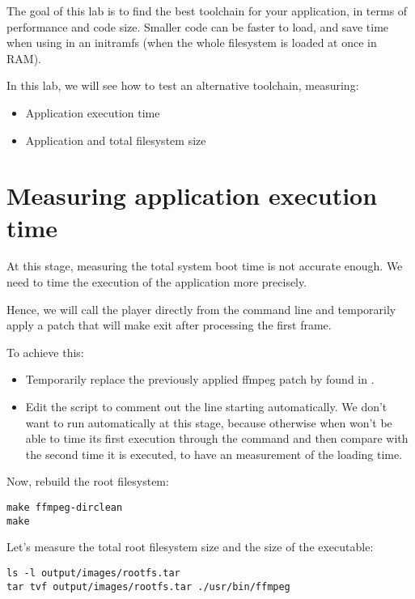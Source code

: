 
The goal of this lab is to find the best toolchain for your application,
in terms of performance and code size. Smaller code can be faster to
load, and save time when using in an initramfs (when the whole
filesystem is loaded at once in RAM).

In this lab, we will see how to test an alternative toolchain, measuring:
\begin{itemize}
 \item Application execution time
 \item Application and total filesystem size
\end{itemize}

\section{Measuring application execution time}

At this stage, measuring the total system boot time is not accurate
enough. We need to time the execution of the application more precisely.

Hence, we will call the  player directly from the command
line and temporarily apply a patch that will make 
exit after processing the first frame.

To achieve this:
\begin{itemize}
\item Temporarily replace the previously applied ffmpeg patch
by  found in
.
\item Edit the  script to comment out the line
starting  automatically. We don't want  to run
automatically at this stage, because otherwise when won't be able to
time its first execution through the  command and then
compare with the second time it is executed, to have an measurement of
the  loading time.
\end{itemize}

Now, rebuild the root filesystem:
\begin{verbatim}
make ffmpeg-dirclean
make
\end{verbatim}

Let's measure the total root filesystem size and the size of the
 executable:

\begin{verbatim}
ls -l output/images/rootfs.tar
tar tvf output/images/rootfs.tar ./usr/bin/ffmpeg
\end{verbatim}

